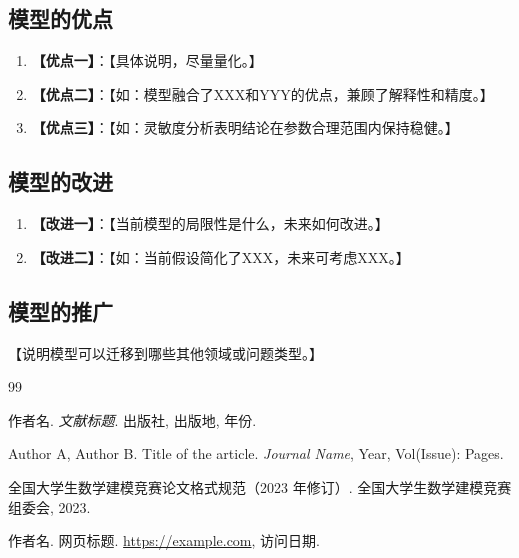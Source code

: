\documentclass[withoutpreface,bwprint]{cumcmthesis}
\newcommand{\scite}[1]{\textsuperscript{[#1]}}
\begin{document}
\subsection{模型的优点}

\begin{enumerate}
    \item \textbf{【优点一】}：【具体说明，尽量量化。】
    \item \textbf{【优点二】}：【如：模型融合了XXX和YYY的优点，兼顾了解释性和精度。】
    \item \textbf{【优点三】}：【如：灵敏度分析表明结论在参数合理范围内保持稳健。】
\end{enumerate}

\subsection{模型的改进}

\begin{enumerate}
    \item \textbf{【改进一】}：【当前模型的局限性是什么，未来如何改进。】
    \item \textbf{【改进二】}：【如：当前假设简化了XXX，未来可考虑XXX。】
\end{enumerate}

\subsection{模型的推广}

【说明模型可以迁移到哪些其他领域或问题类型。】

\begin{thebibliography}{99}

    作者名. \textit{文献标题}\allowbreak[M]. 出版社, 出版地, 年份.

    Author A, Author B. Title of the article\allowbreak[J]. \textit{Journal Name}, Year, Vol(Issue): Pages.

    全国大学生数学建模竞赛论文格式规范（2023 年修订）\allowbreak[S]. 全国大学生数学建模竞赛组委会, 2023.

    作者名. 网页标题\allowbreak[EB/OL]. \url{https://example.com}, 访问日期.

\end{thebibliography}
\end{document}
